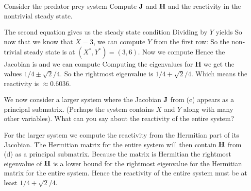 \subquestion 
Consider the predator prey system 
Compute $\bf J$ and $\bf H$ and the reactivity in the nontrivial steady state. 

\solution
The second equation gives us the steady state condition
Dividing by $Y$ yields 
So now that we know that $X=3$, we can compute $Y$ from the first row:
So the non-trivial steady state is at $(X^*,Y^*)=(3,6).$ Now we compute 
Hence the Jacobian is 
and we can compute 
Computing the eigenvalues for {\bf H} we get the values $1/4 \pm\sqrt{2}/4$. So the rightmost eigenvalue is $1/4 +\sqrt{2}/4$. Which means the reactivity is $\approx 0.6036$.

\subquestion 
We now consider a larger system where the Jacobian $\bf J$ from (c) appears as a principal submatrix. (Perhaps the system contains $X$ and $Y$ along with many other variables). What can you say about the reactivity of the entire system? 

\solution
For the larger system we compute the reactivity from the Hermitian part of its Jacobian. The Hermitian matrix for the entire system will then contain $\bf H$ from (d) as a principal submatrix. Because the matrix is Hermitian the rightmost eigenvalue of $\bf H$ is a lower bound for the rightmost eigenvalue for the Hermitian matrix for the entire system. Hence the reactivity of the entire system must be at least $1/4+\sqrt{2}/4$.   
